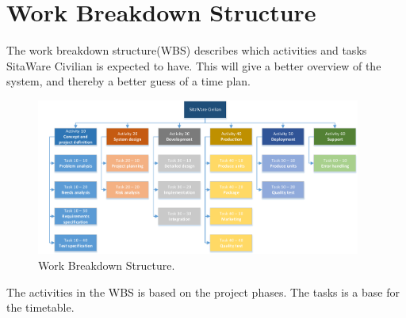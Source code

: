 \chapter{Work Breakdown Structure}
\label{chap:wbs}

The work breakdown structure(WBS) describes which activities and tasks SitaWare Civilian is expected to have. This will give a better overview of the system, and thereby a better guess of a time plan.

\begin{figure}[H]
\centering
\includegraphics[width=0.95\textwidth]
{Billeder/WBS/WBS_v1.0.pdf}
\caption{Work Breakdown Structure.}
\label{fig:WBS}
\end{figure}

The activities in the WBS is based on the project phases. The tasks is a base for the timetable.

